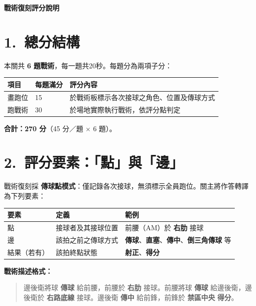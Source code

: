 \documentclass[11pt]{article}
\newcommand{\term}[1]{\textbf{#1}}
\begin{document}
{\LARGE\bfseries 戰術復刻評分說明\par}
\vspace{0.8em}

\section*{1.\ 總分結構}

本關共 \term{6 題戰術}，每一題共20秒。每題分為兩項子分：

\vspace{0.4em}
\begin{tabular}{@{}lll@{}}
\toprule
\textbf{項目} & \textbf{每題滿分} & \textbf{評分內容} \\
\midrule
畫跑位 & 15 & 於戰術板標示各次接球之角色、位置及傳球方式 \\
跑戰術 & 30 & 於場地實際執行戰術，依評分點判定 \\
\bottomrule
\end{tabular}

\vspace{0.4em}
\noindent
\textbf{合計：270 分}（45 分／題 $\times$ 6 題）。

\section*{2.\ 評分要素：「點」與「邊」}

戰術復刻採 \term{傳球點模式}：僅記錄各次接球，無須標示全員跑位。關主將作答轉譯為下列要素：

\vspace{0.4em}
\begin{tabular}{@{}p{2.2cm}p{4.2cm}p{6.8cm}@{}}
\toprule
\textbf{要素} & \textbf{定義} & \textbf{範例} \\
\midrule
點 & 接球者及其接球位置 & 前腰（AM）於 \term{右肋} 接球 \\
邊 & 該拍之前之傳球方式 & \term{傳球}、\term{直塞}、\term{傳中}、\term{倒三角傳球} 等 \\
結果（若有） & 該拍終點狀態 & \term{射正}、\term{得分} \\
\bottomrule
\end{tabular}

\vspace{0.6em}
\noindent\textbf{戰術描述格式：}

\begin{quote}
邊後衛將球 \term{傳球} 給前腰，前腰於 \term{右肋} 接球。前腰將球 \term{傳球} 給邊後衛，邊後衛於 \term{右路底線} 接球。邊後衛 \term{傳中} 給前鋒，前鋒於 \term{禁區中央} \term{得分}。
\end{quote}
\end{document}
